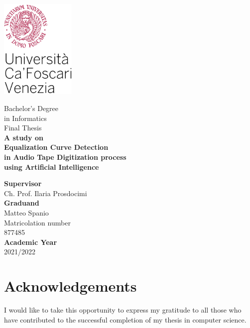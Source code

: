 \newcommand{\blankpage}{\null\thispagestyle{empty}\addtocounter{page}{-1}\newpage}
\newcommand{\emptypage}{\clearpage}

\begin{titlepage}
    \includegraphics[width=36mm]{../../source/_static/img/logo-cafoscari.jpg}\\[20mm] %

    \begin{center}
        \Large Bachelor's Degree\\in Informatics\\[20mm]
        \Large Final Thesis\\[10mm]
        \textbf{\Huge A study on\\Equalization Curve Detection\\in Audio Tape Digitization process\\using Artificial Intelligence}\\[20mm]
    \end{center}

    \textbf{Supervisor}\\Ch. Prof. Ilaria Prosdocimi\\[10mm]
    \textbf{Graduand}\\Matteo Spanio\\Matricolation number\\877485\\[10mm]
    \textbf{Academic Year}\\2021/2022

\end{titlepage}

\blankpage
\onehalfspacing
{}

\chapter*{Acknowledgements}

I would like to take this opportunity to express my gratitude to all those who have contributed to the successful completion of my thesis in computer science.


